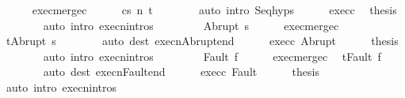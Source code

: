 \begin{isabellebody}
\ \ \ \ \isamarkupfalse%
\ exec{\isacharunderscore}merge{\isacharunderscore}c{}\isanewline
\ \ \ \ \isamarkupfalse%
\ {\isachardoublequoteopen}{\isasymGamma}{\isasymturnstile}{\isasymlangle}c{}{\isacharcomma}s{\isacharprime}{\isasymrangle}\ {\isacharequal}n{\isasymRightarrow}\ t{\isachardoublequoteclose}\isanewline
\ \ \ \ \ \ \isamarkupfalse%
\ {\isacharparenleft}auto\ intro{\isacharcolon}\ Seq{\isachardot}hyps{\isacharparenright}\isanewline
\ \ \ \ \isamarkupfalse%
\ exec{\isacharunderscore}c{}\ \isamarkupfalse%
\ {\isacharquery}thesis\isanewline
\ \ \ \ \ \ \isamarkupfalse%
\ {\isacharparenleft}auto\ intro{\isacharcolon}\ execn{\isachardot}intros{\isacharparenright}\isanewline
\ \ \isamarkupfalse%
\isanewline
\ \ \ \ \isamarkupfalse%
\ {\isacharparenleft}Abrupt\ s{\isacharprime}{\isacharprime}{\isacharparenright}\isanewline
\ \ \ \ \isamarkupfalse%
\ exec{\isacharunderscore}merge{\isacharunderscore}c{}\ \isamarkupfalse%
\ {\isachardoublequoteopen}t{\isacharequal}Abrupt\ s{\isacharprime}{\isacharprime}{\isachardoublequoteclose}\isanewline
\ \ \ \ \ \ \isamarkupfalse%
\ {\isacharparenleft}auto\ dest{\isacharcolon}\ execn{\isacharunderscore}Abrupt{\isacharunderscore}end{\isacharparenright}\isanewline
\ \ \ \ \isamarkupfalse%
\ exec{\isacharunderscore}c{}\ Abrupt\isanewline
\ \ \ \ \isamarkupfalse%
\ {\isacharquery}thesis\isanewline
\ \ \ \ \ \ \isamarkupfalse%
\ {\isacharparenleft}auto\ intro{\isacharcolon}\ execn{\isachardot}intros{\isacharparenright}\isanewline
\ \ \isamarkupfalse%
\isanewline
\ \ \ \ \isamarkupfalse%
\ {\isacharparenleft}Fault\ f{\isacharparenright}\isanewline
\ \ \ \ \isamarkupfalse%
\ exec{\isacharunderscore}merge{\isacharunderscore}c{}\ \isamarkupfalse%
\ {\isachardoublequoteopen}t{\isacharequal}Fault\ f{\isachardoublequoteclose}\isanewline
\ \ \ \ \ \ \isamarkupfalse%
\ {\isacharparenleft}auto\ dest{\isacharcolon}\ execn{\isacharunderscore}Fault{\isacharunderscore}end{\isacharparenright}\isanewline
\ \ \ \ \isamarkupfalse%
\ exec{\isacharunderscore}c{}\ Fault\isanewline
\ \ \ \ \isamarkupfalse%
\ {\isacharquery}thesis\isanewline
\ \ \ \ \ \ \isamarkupfalse%
\ {\isacharparenleft}auto\ intro{\isacharcolon}\ execn{\isachardot}intros{\isacharparenright}\isanewline

\end{isabellebody}
